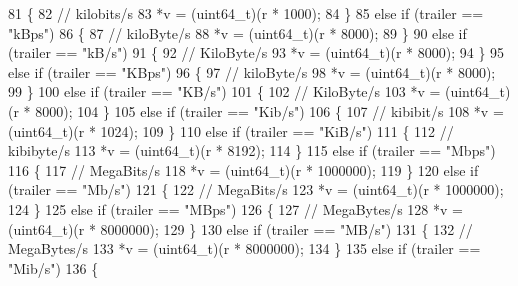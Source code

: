 \begin{DoxyCode}
81         \{
82           \textcolor{comment}{// kilobits/s}
83           *v = (uint64\_t)(r * 1000);
84         \}
85       \textcolor{keywordflow}{else} \textcolor{keywordflow}{if} (trailer == \textcolor{stringliteral}{"kBps"})
86         \{
87           \textcolor{comment}{// kiloByte/s}
88           *v = (uint64\_t)(r * 8000);
89         \}
90       \textcolor{keywordflow}{else} \textcolor{keywordflow}{if} (trailer == \textcolor{stringliteral}{"kB/s"})
91         \{
92           \textcolor{comment}{// KiloByte/s}
93           *v = (uint64\_t)(r * 8000);
94         \}
95       \textcolor{keywordflow}{else} \textcolor{keywordflow}{if} (trailer == \textcolor{stringliteral}{"KBps"})
96         \{
97           \textcolor{comment}{// kiloByte/s}
98           *v = (uint64\_t)(r * 8000);
99         \}
100       \textcolor{keywordflow}{else} \textcolor{keywordflow}{if} (trailer == \textcolor{stringliteral}{"KB/s"})
101         \{
102           \textcolor{comment}{// KiloByte/s}
103           *v = (uint64\_t)(r * 8000);
104         \}
105       \textcolor{keywordflow}{else} \textcolor{keywordflow}{if} (trailer == \textcolor{stringliteral}{"Kib/s"})
106         \{
107           \textcolor{comment}{// kibibit/s}
108           *v = (uint64\_t)(r * 1024);
109         \}
110       \textcolor{keywordflow}{else} \textcolor{keywordflow}{if} (trailer == \textcolor{stringliteral}{"KiB/s"})
111         \{
112           \textcolor{comment}{// kibibyte/s}
113           *v = (uint64\_t)(r * 8192);
114         \}
115       \textcolor{keywordflow}{else} \textcolor{keywordflow}{if} (trailer == \textcolor{stringliteral}{"Mbps"})
116         \{
117           \textcolor{comment}{// MegaBits/s}
118           *v = (uint64\_t)(r * 1000000);
119         \}
120       \textcolor{keywordflow}{else} \textcolor{keywordflow}{if} (trailer == \textcolor{stringliteral}{"Mb/s"})
121         \{
122           \textcolor{comment}{// MegaBits/s}
123           *v = (uint64\_t)(r * 1000000);
124         \}
125       \textcolor{keywordflow}{else} \textcolor{keywordflow}{if} (trailer == \textcolor{stringliteral}{"MBps"})
126         \{
127           \textcolor{comment}{// MegaBytes/s}
128           *v = (uint64\_t)(r * 8000000);
129         \}
130       \textcolor{keywordflow}{else} \textcolor{keywordflow}{if} (trailer == \textcolor{stringliteral}{"MB/s"})
131         \{
132           \textcolor{comment}{// MegaBytes/s}
133           *v = (uint64\_t)(r * 8000000);
134         \}
135       \textcolor{keywordflow}{else} \textcolor{keywordflow}{if} (trailer == \textcolor{stringliteral}{"Mib/s"})
136         \{

\end{DoxyCode}
